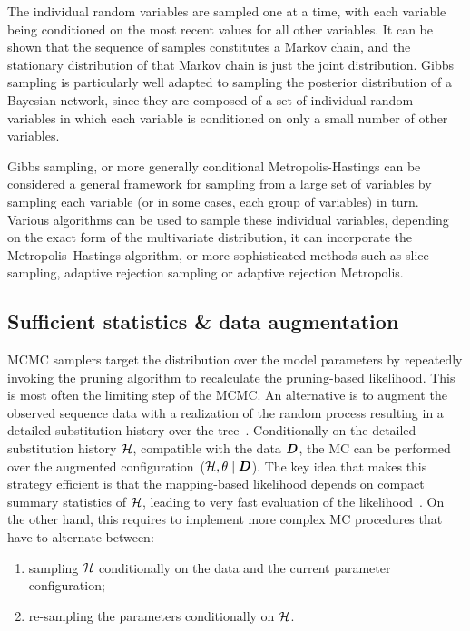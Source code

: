 The individual random variables are sampled one at a time, with each variable being conditioned on the most recent values for all other variables.
It can be shown that the sequence of samples constitutes a \gls{Markov chain}, and the stationary distribution of that \gls{Markov chain} is just the joint distribution.
Gibbs sampling is particularly well adapted to sampling the \gls{posterior} distribution of a Bayesian network, since they are composed of a set of individual random variables in which each variable is conditioned on only a small number of other variables.

Gibbs sampling, or more generally conditional Metropolis-Hastings can be considered a general framework for sampling from a large set of variables by sampling each variable (or in some cases, each group of variables) in turn.
Various algorithms can be used to sample these individual variables, depending on the exact form of the multivariate distribution, it can incorporate the Metropolis–Hastings algorithm, or more sophisticated methods such as slice sampling, adaptive rejection sampling or adaptive rejection Metropolis.

\subsection{Sufficient statistics \& data augmentation}
\label{subsec:suffstats-data-augmentation}

MCMC samplers target the distribution over the model parameters by repeatedly invoking the pruning algorithm to recalculate the pruning-based \gls{likelihood}.
This is most often the limiting step of the \acrshort{MCMC}.
An alternative is to augment the observed sequence data with a realization of the random process resulting in a detailed \gls{substitution} history over the tree~\citep{Nielsen2002,Rodrigue2008}.
Conditionally on the detailed \gls{substitution} history $\mathcal{H}$, compatible with the data $\bm{D}$, the \acrshort{MC} can be performed over the augmented configuration~($\mathcal{H}, \theta \mid \bm{D}$).
The key idea that makes this strategy efficient is that the mapping-based \gls{likelihood} depends on compact summary statistics of $\mathcal{H}$, leading to very fast evaluation of the likelihood~\citep{Lartillot2006,DeKoning2010,Romiguier2012,Irvahn2014,Davydov2016,Gueguen2018}.
On the other hand, this requires to implement more complex \acrshort{MC} procedures that have to alternate between:
\begin{enumerate}
    \item sampling $\mathcal{H}$ conditionally on the data and the current parameter configuration;
    \item re-sampling the parameters conditionally on $\mathcal{H}$.
\end{enumerate}

